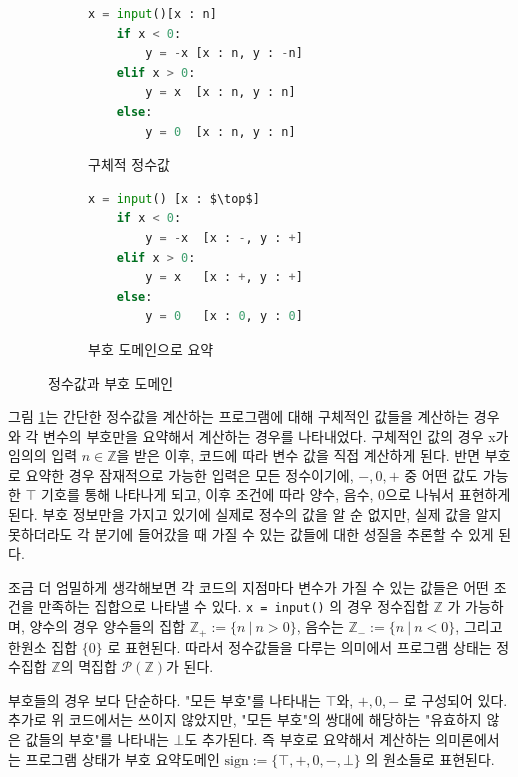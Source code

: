 \documentclass[a4paper,12pt]{article}
\begin{document}
\begin{figure}[h]
    \centering

    \begin{subfigure}[t]{0.48\textwidth}
    \begin{lstlisting}[language=Python, mathescape]
    x = input()[x : n]
    if x < 0:
        y = -x [x : n, y : -n]
    elif x > 0:
        y = x  [x : n, y : n]
    else:
        y = 0  [x : n, y : n]
    \end{lstlisting}
    \caption{구체적 정수값}
    \end{subfigure}
    \hfill
    \begin{subfigure}[t]{0.48\textwidth}
    \begin{lstlisting}[language=Python, mathescape]
    x = input() [x : $\top$]
    if x < 0:
        y = -x  [x : -, y : +]
    elif x > 0:
        y = x   [x : +, y : +]
    else:
        y = 0   [x : 0, y : 0]
    \end{lstlisting}
    \caption{부호 도메인으로 요약}
    \end{subfigure}

    \caption{정수값과 부호 도메인}
    \label{fig:int_sign_abstraction}
\end{figure}

그림 \ref{fig:int_sign_abstraction}는 간단한 정수값을 계산하는 프로그램에 대해 구체적인 값들을 계산하는 경우와 각 변수의 부호만을 요약해서 계산하는 경우를 나타내었다.
구체적인 값의 경우 x가 임의의 입력 $n \in \mathbb{Z}$을 받은 이후, 코드에 따라 변수 값을 직접 계산하게 된다. 반면 부호로 요약한 경우 잠재적으로 가능한 입력은 모든 정수이기에,
$-, 0, +$ 중 어떤 값도 가능한 $\top$ 기호를 통해 나타나게 되고, 이후 조건에 따라 양수, 음수, 0으로 나눠서 표현하게 된다. 부호 정보만을 가지고 있기에 실제로 정수의 값을 알 순 없지만,
실제 값을 알지 못하더라도 각 분기에 들어갔을 때 가질 수 있는 값들에 대한 성질을 추론할 수 있게 된다.

조금 더 엄밀하게 생각해보면 각 코드의 지점마다 변수가 가질 수 있는 값들은 어떤 조건을 만족하는 집합으로 나타낼 수 있다. \verb|x = input()| 의 경우 정수집합 $\mathbb{Z}$ 가 가능하며, 양수의 경우
양수들의 집합 $\mathbb{Z}_{+} := \{n \ | \ n > 0\}$, 음수는 $\mathbb{Z}_{-} := \{n \ | \ n < 0\}$, 그리고 한원소 집합 $\{0\}$ 로 표현된다. 따라서 정수값들을 다루는 의미에서 프로그램 상태는
정수집합 $\mathbb{Z}$의 멱집합 $\mathcal{P}(\mathbb{Z})$가 된다.

부호들의 경우 보다 단순하다. "모든 부호"를 나타내는 $\top$와, $+, 0, -$ 로 구성되어 있다. 추가로 위 코드에서는 쓰이지 않았지만, "모든 부호"의 쌍대에 해당하는 "유효하지 않은 값들의 부호"를 나타내는 $\bot$도 추가된다.
즉 부호로 요약해서 계산하는 의미론에서는 프로그램 상태가 부호 요약도메인 $\mathrm{sign} := \{\top, +, 0, -, \bot\}$ 의 원소들로 표현된다.
\end{document}
